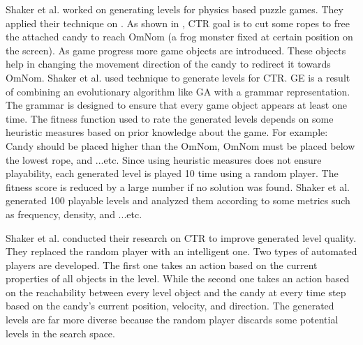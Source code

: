 Shaker et al.\cite{ctrAutomaticGeneration} worked on generating levels for physics based puzzle games. They applied their technique on . As shown in , CTR goal is to cut some ropes to free the attached candy to reach OmNom (a frog monster fixed at certain position on the screen). As game progress more game objects are introduced. These objects help in changing the movement direction of the candy to redirect it towards OmNom. Shaker et al. used  technique to generate levels for CTR. GE is a result of combining an evolutionary algorithm like GA with a grammar representation. The grammar is designed to ensure that every game object appears at least one time. The fitness function used to rate the generated levels depends on some heuristic measures based on prior knowledge about the game. For example: Candy should be placed higher than the OmNom, OmNom must be placed below the lowest rope, and ...etc. Since using heuristic measures does not ensure playability, each generated level is played 10 time using a random player. The fitness score is reduced by a large number if no solution was found. Shaker et al. generated 100 playable levels and analyzed them according to some metrics such as frequency, density, and ...etc.\\\par

Shaker et al.\cite{ctrSimulationApproach} conducted their research on CTR to improve generated level quality. They replaced the random player with an intelligent one. Two types of automated players are developed. The first one takes an action based on the current properties of all objects in the level. While the second one takes an action based on the reachability between every level object and the candy at every time step based on the candy's current position, velocity, and direction. The generated levels are far more diverse because the random player discards some potential levels in the search space.\\\par

